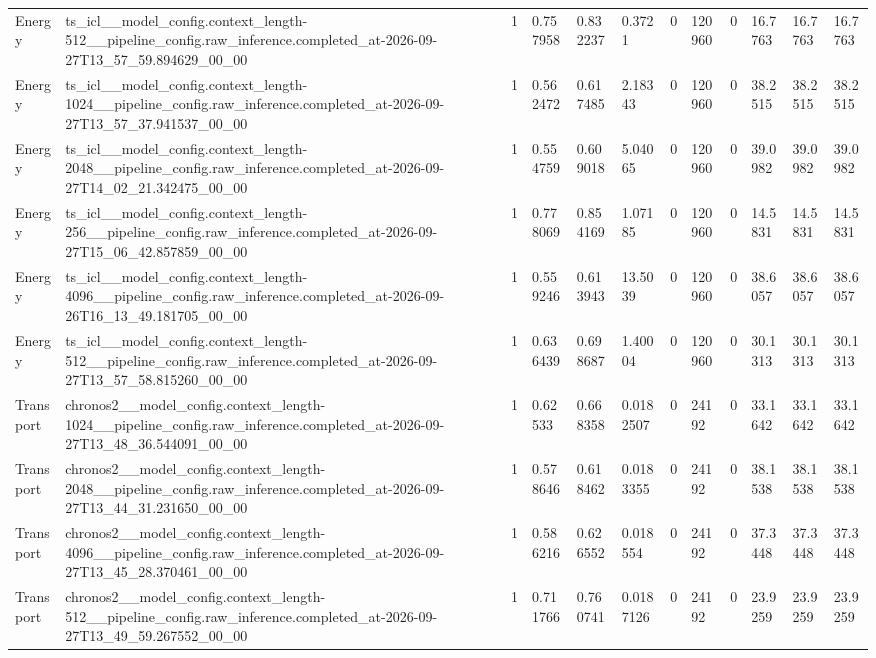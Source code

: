\begin{tabular}{llllllllllll}
Energy & ts\_icl\_\_model\_config.context\_length-512\_\_pipeline\_config.raw\_inference.completed\_at-2026-09-27T13\_57\_59.894629\_00\_00 & 1 & 0.757958 & 0.832237 & 0.3721 & 0 & 120960 & 0 & 16.7763 & 16.7763 & 16.7763 \\
Energy & ts\_icl\_\_model\_config.context\_length-1024\_\_pipeline\_config.raw\_inference.completed\_at-2026-09-27T13\_57\_37.941537\_00\_00 & 1 & 0.562472 & 0.617485 & 2.18343 & 0 & 120960 & 0 & 38.2515 & 38.2515 & 38.2515 \\
Energy & ts\_icl\_\_model\_config.context\_length-2048\_\_pipeline\_config.raw\_inference.completed\_at-2026-09-27T14\_02\_21.342475\_00\_00 & 1 & 0.554759 & 0.609018 & 5.04065 & 0 & 120960 & 0 & 39.0982 & 39.0982 & 39.0982 \\
Energy & ts\_icl\_\_model\_config.context\_length-256\_\_pipeline\_config.raw\_inference.completed\_at-2026-09-27T15\_06\_42.857859\_00\_00 & 1 & 0.778069 & 0.854169 & 1.07185 & 0 & 120960 & 0 & 14.5831 & 14.5831 & 14.5831 \\
Energy & ts\_icl\_\_model\_config.context\_length-4096\_\_pipeline\_config.raw\_inference.completed\_at-2026-09-26T16\_13\_49.181705\_00\_00 & 1 & 0.559246 & 0.613943 & 13.5039 & 0 & 120960 & 0 & 38.6057 & 38.6057 & 38.6057 \\
Energy & ts\_icl\_\_model\_config.context\_length-512\_\_pipeline\_config.raw\_inference.completed\_at-2026-09-27T13\_57\_58.815260\_00\_00 & 1 & 0.636439 & 0.698687 & 1.40004 & 0 & 120960 & 0 & 30.1313 & 30.1313 & 30.1313 \\
Transport & chronos2\_\_model\_config.context\_length-1024\_\_pipeline\_config.raw\_inference.completed\_at-2026-09-27T13\_48\_36.544091\_00\_00 & 1 & 0.62533 & 0.668358 & 0.0182507 & 0 & 24192 & 0 & 33.1642 & 33.1642 & 33.1642 \\
Transport & chronos2\_\_model\_config.context\_length-2048\_\_pipeline\_config.raw\_inference.completed\_at-2026-09-27T13\_44\_31.231650\_00\_00 & 1 & 0.578646 & 0.618462 & 0.0183355 & 0 & 24192 & 0 & 38.1538 & 38.1538 & 38.1538 \\
Transport & chronos2\_\_model\_config.context\_length-4096\_\_pipeline\_config.raw\_inference.completed\_at-2026-09-27T13\_45\_28.370461\_00\_00 & 1 & 0.586216 & 0.626552 & 0.018554 & 0 & 24192 & 0 & 37.3448 & 37.3448 & 37.3448 \\
Transport & chronos2\_\_model\_config.context\_length-512\_\_pipeline\_config.raw\_inference.completed\_at-2026-09-27T13\_49\_59.267552\_00\_00 & 1 & 0.711766 & 0.760741 & 0.0187126 & 0 & 24192 & 0 & 23.9259 & 23.9259 & 23.9259 \\

\end{tabular}
